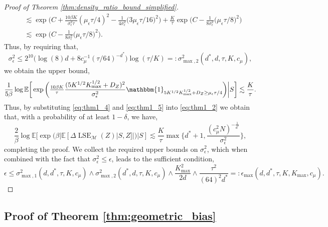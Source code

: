 \documentclass[10pt]{article}
\theoremstyle{plain}
\theoremstyle{definition}
\theoremstyle{remark}
\newcommand{\M}{{\mathcal{M}}}
\newcommand{\lse}{\operatorname{LSE}}
\newcommand{\E}{\mathbb{E}}
\begin{document}
\begin{proof}[Proof of Theorem \ref{thm:density_ratio_bound_simplified}]
\begin{align*}
    &\lesssim \exp \bigg ( C + \tfrac{10\beta K}{\sigma^2_\epsilon \tau}(\mu_\epsilon \tau/4)^2 - \frac{1}{4\sigma_\epsilon^2} \big ( 3 \mu_\epsilon \tau/16 \big )^2 \bigg ) + \frac{K}{\tau} \exp \bigg ( C - \frac{1}{8\sigma_\epsilon^2} \big ( \mu_\epsilon \tau/8 \big )^2 \bigg )\\
    &\lesssim \exp \bigg ( C - \frac{1}{8\sigma_\epsilon^2} \big ( \mu_\epsilon \tau/8 \big )^2 \bigg ).
\end{align*}
Thus, by requiring that, 
\begin{equation*}
    \sigma_\epsilon^2 \leq 2^{10} \Big ( \log(8) d + 8 c_\mu^{-1} (\tau/64)^{-d^*} \Big ) \log (\tau/K) =: \sigma^2_{\max, 2}(d^*, d, \tau, K, c_\mu),
\end{equation*}
we obtain the upper bound,
\begin{equation}
    \frac{1}{5\beta} \log \E \bigg [ \exp \bigg ( \tfrac{10\beta K}{\tau} \frac{(5 K^{1/2} K_{\max}^{1/2} + D_Z)^2}{\sigma^2_\epsilon} \mathbbm{1}_{5 K^{1/2} K_{\max}^{1/2}+D_Z \geq \mu_\epsilon \tau/4} \bigg ) \bigg | S \bigg ] \lesssim \frac{K}{\tau}.\label{eq:thm1_5}
\end{equation}
Thus, by substituting \eqref{eq:thm1_4} and \eqref{eq:thm1_5} into \eqref{eq:thm1_2} we obtain that, with a probability of at least \(1-\delta\), we have,
\begin{equation*}
    \frac{2}{\beta} \log \E[\exp (\beta | \E[\Delta \lse_\M(Z)|S, Z] |) | S] \lesssim \frac{K}{\tau} \max \bigg \{ d^* + 1, \frac{(c_\mu^2 N)^{-\frac{1}{d^*}}}{\sigma_\epsilon^{2}} \bigg \},
\end{equation*}
completing the proof. We collect the required upper bounds on \(\sigma_\epsilon^2\), which when combined with the fact that \(\sigma_\epsilon^2 \leq \epsilon\), leads to the sufficient condition,
\begin{equation}\label{eq:epsilon_min}
    \epsilon \leq \sigma_{\max, 1}^2(d, d^*, \tau, K, c_\mu) \wedge \sigma^2_{\max, 2}(d^*, d, \tau, K, c_\mu) \wedge \frac{K^2_{\max}}{2d} \wedge \frac{\tau^2}{(64)^2d^*} =: \epsilon_{\max}(d, d^*, \tau, K, K_{\max}, c_\mu).
\end{equation}
\end{proof}


\subsection{Proof of Theorem \ref{thm:geometric_bias}}
\end{document}
